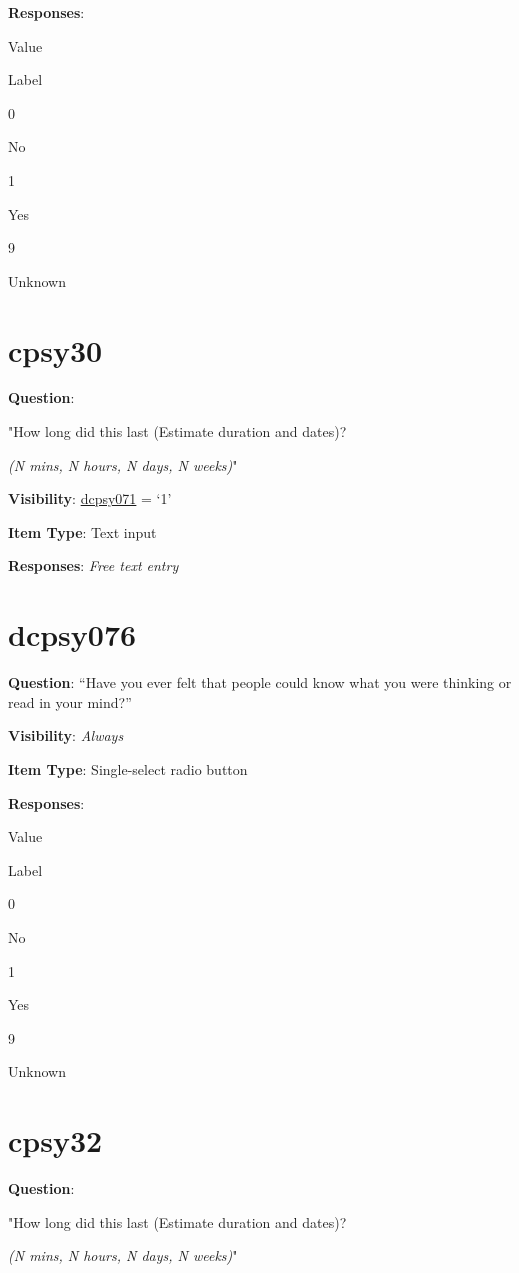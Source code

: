 \documentclass[]{book}
\begin{document}
\textbf{Responses}:

Value

Label

0

No

1

Yes

9

Unknown

\hypertarget{cpsy30}{%
\section{cpsy30}\label{cpsy30}}

\textbf{Question}:

"How long did this last (Estimate duration and dates)?

\emph{(N mins, N hours, N days, N weeks)}"

\textbf{Visibility}: \protect\hyperlink{dcpsy071}{dcpsy071} = `1'

\textbf{Item Type}: Text input

\textbf{Responses}: \emph{Free text entry}

\hypertarget{dcpsy076}{%
\section{dcpsy076}\label{dcpsy076}}

\textbf{Question}: ``Have you ever felt that people could know what you were thinking or read in your mind?''

\textbf{Visibility}: \emph{Always}

\textbf{Item Type}: Single-select radio button

\textbf{Responses}:

Value

Label

0

No

1

Yes

9

Unknown

\hypertarget{cpsy32}{%
\section{cpsy32}\label{cpsy32}}

\textbf{Question}:

"How long did this last (Estimate duration and dates)?

\emph{(N mins, N hours, N days, N weeks)}"
\end{document}
